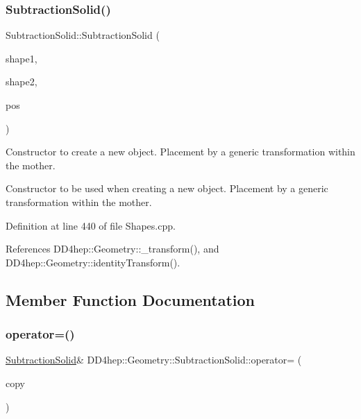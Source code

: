 \subsubsection{\texorpdfstring{Subtraction\+Solid()}{SubtractionSolid()}\hspace{0.1cm}{\footnotesize\ttfamily [8/8]}}
{\footnotesize\ttfamily Subtraction\+Solid\+::\+Subtraction\+Solid (\begin{DoxyParamCaption}\item[{const \hyperlink{namespace_d_d4hep_1_1_geometry_a83de90a8dcc7378ba47d54ef9a6a687b}{Solid} \&}]{shape1,  }\item[{const \hyperlink{namespace_d_d4hep_1_1_geometry_a83de90a8dcc7378ba47d54ef9a6a687b}{Solid} \&}]{shape2,  }\item[{const \hyperlink{namespace_d_d4hep_1_1_geometry_aeb4c0356d12fd7be49a0aae50514e64b}{Transform3D} \&}]{pos }\end{DoxyParamCaption})}



Constructor to create a new object. Placement by a generic transformation within the mother. 

Constructor to be used when creating a new object. Placement by a generic transformation within the mother. 

Definition at line 440 of file Shapes.\+cpp.



References D\+D4hep\+::\+Geometry\+::\+\_\+transform(), and D\+D4hep\+::\+Geometry\+::identity\+Transform().



\subsection{Member Function Documentation}
\hypertarget{class_d_d4hep_1_1_geometry_1_1_subtraction_solid_a72938e6ff2903a3d5ecad0b3a3d9fd29}{}\label{class_d_d4hep_1_1_geometry_1_1_subtraction_solid_a72938e6ff2903a3d5ecad0b3a3d9fd29} 
\subsubsection{\texorpdfstring{operator=()}{operator=()}}
{\footnotesize\ttfamily \hyperlink{class_d_d4hep_1_1_geometry_1_1_subtraction_solid}{Subtraction\+Solid}\& D\+D4hep\+::\+Geometry\+::\+Subtraction\+Solid\+::operator= (\begin{DoxyParamCaption}\item[{const \hyperlink{class_d_d4hep_1_1_geometry_1_1_subtraction_solid}{Subtraction\+Solid} \&}]{copy }\end{DoxyParamCaption})\hspace{0.3cm}{\ttfamily [default]}}



